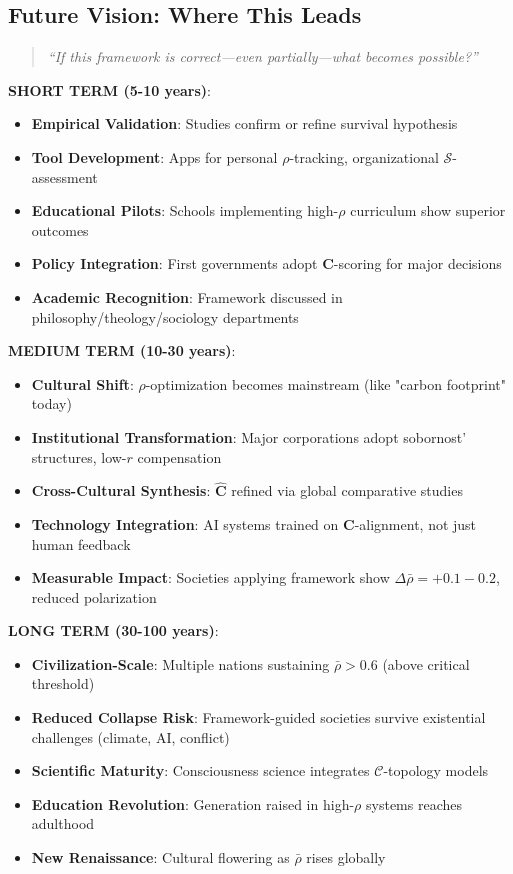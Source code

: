\documentclass[11pt,a4paper]{article}
\theoremstyle{definition}
\theoremstyle{remark}
\newcommand{\CC}{\mathcal{C}}
\begin{document}
\begin{small}
\begin{enumerate}
\begin{protocol}
\subsection{Future Vision: Where This Leads}

\begin{quote}
\textit{``If this framework is correct—even partially—what becomes possible?''}
\end{quote}

\textbf{SHORT TERM (5-10 years)}:
\begin{itemize}
    \item \textbf{Empirical Validation}: Studies confirm or refine survival hypothesis
    \item \textbf{Tool Development}: Apps for personal \(\rho\)-tracking, organizational \(\mathcal{S}\)-assessment
    \item \textbf{Educational Pilots}: Schools implementing high-\(\rho\) curriculum show superior outcomes
    \item \textbf{Policy Integration}: First governments adopt \(\mathbf{C}\)-scoring for major decisions
    \item \textbf{Academic Recognition}: Framework discussed in philosophy/theology/sociology departments
\end{itemize}

\textbf{MEDIUM TERM (10-30 years)}:
\begin{itemize}
    \item \textbf{Cultural Shift}: \(\rho\)-optimization becomes mainstream (like "carbon footprint" today)
    \item \textbf{Institutional Transformation}: Major corporations adopt sobornost' structures, low-\(r\) compensation
    \item \textbf{Cross-Cultural Synthesis}: \(\hat{\mathbf{C}}\) refined via global comparative studies
    \item \textbf{Technology Integration}: AI systems trained on \(\mathbf{C}\)-alignment, not just human feedback
    \item \textbf{Measurable Impact}: Societies applying framework show \(\Delta\bar{\rho} = +0.1-0.2\), reduced polarization
\end{itemize}

\textbf{LONG TERM (30-100 years)}:
\begin{itemize}
    \item \textbf{Civilization-Scale}: Multiple nations sustaining \(\bar{\rho} > 0.6\) (above critical threshold)
    \item \textbf{Reduced Collapse Risk}: Framework-guided societies survive existential challenges (climate, AI, conflict)
    \item \textbf{Scientific Maturity}: Consciousness science integrates \(\CC\)-topology models
    \item \textbf{Education Revolution}: Generation raised in high-\(\rho\) systems reaches adulthood
    \item \textbf{New Renaissance}: Cultural flowering as \(\bar{\rho}\) rises globally
\end{itemize}


\end{protocol}
\end{enumerate}
\end{small}
\end{document}
